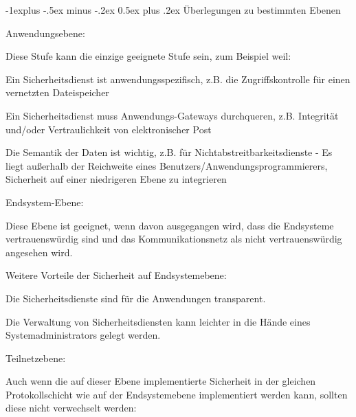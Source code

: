 \documentclass[a4paper]{article}
\makeatletter
\renewcommand{\subsection}{\@startsection{subsection}{2}{0mm}%
 {-1explus -.5ex minus -.2ex}%
 {0.5ex plus .2ex}%
 {\normalfont\normalsize\bfseries}}
\makeatother
\begin{document}
\begin{multicols}{3}
      \subsection{Überlegungen zu bestimmten Ebenen}
      \begin{itemize*}
            \item Anwendungsebene:
            \begin{itemize*}
                  \item Diese Stufe kann die einzige geeignete Stufe sein, zum Beispiel weil:
                  \begin{itemize*}
                        \item Ein Sicherheitsdienst ist anwendungsspezifisch, z.B. die Zugriffskontrolle für einen vernetzten Dateispeicher
                        \item Ein Sicherheitsdienst muss Anwendungs-Gateways durchqueren, z.B. Integrität und/oder Vertraulichkeit von elektronischer Post
                        \item Die Semantik der Daten ist wichtig, z.B. für Nichtabstreitbarkeitsdienste - Es liegt außerhalb der Reichweite eines Benutzers/Anwendungsprogrammierers, Sicherheit auf einer niedrigeren Ebene zu integrieren
                  \end{itemize*}
            \end{itemize*}
            \item Endsystem-Ebene:
            \begin{itemize*}
                  \item Diese Ebene ist geeignet, wenn davon ausgegangen wird, dass die Endsysteme vertrauenswürdig sind und das Kommunikationsnetz als nicht vertrauenswürdig angesehen wird.
                  \item Weitere Vorteile der Sicherheit auf Endsystemebene:
                  \begin{itemize*}
                        \item Die Sicherheitsdienste sind für die Anwendungen transparent.
                        \item Die Verwaltung von Sicherheitsdiensten kann leichter in die Hände eines Systemadministrators gelegt werden.
                  \end{itemize*}
            \end{itemize*}
            \item Teilnetzebene:
            \begin{itemize*}
                  \item Auch wenn die auf dieser Ebene implementierte Sicherheit in der gleichen Protokollschicht wie auf der Endsystemebene implementiert werden kann, sollten diese nicht verwechselt werden:

\end{itemize*}
\end{itemize*}
\end{multicols}
\end{document}
